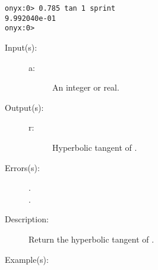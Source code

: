 \begin{description}
\begin{description}
\begin{verbatim}
onyx:0> 0.785 tan 1 sprint
9.992040e-01
onyx:0>
		\end{verbatim}
	\end{description}
\label{systemdict:tanh}
\item[{\onyxop{a}{tanh}{r}}: ]
	\begin{description}\item[]
	\item[Input(s): ]
		\begin{description}\item[]
		\item[a: ]
			An integer or real.
		\end{description}
	\item[Output(s): ]
		\begin{description}\item[]
		\item[r: ]
			Hyperbolic tangent of .
		\end{description}
	\item[Errors(s): ]
		\begin{description}\item[]
		\item[.]
		\item[.]
		\end{description}
	\item[Description: ]
		Return the hyperbolic tangent of .
	\item[Example(s): ]\begin{verbatim}


\end{verbatim}
\end{description}
\end{description}
